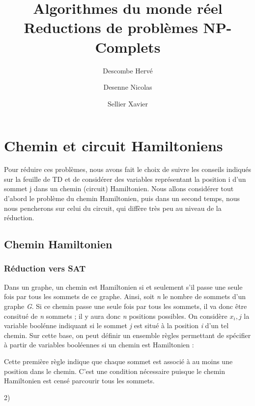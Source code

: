 \documentclass{article}
\title{Algorithmes du monde r\'eel\\Reductions de probl\`emes NP-Complets}
\author{Descombe Herv\'e \and Desenne Nicolas \and Sellier Xavier}
\begin{document}
\maketitle
\newpage
\tableofcontents
\newpage

\section{Chemin et circuit Hamiltoniens}

Pour r\'eduire ces probl\`emes, nous avons fait le choix de suivre les conseils indiqu\'es sur
la feuille de TD et de consid\'erer des variables repr\'esentant la position i d'un sommet j
dans un chemin (circuit) Hamiltonien. Nous allons consid\'erer tout d'abord le probl\`eme du
chemin Hamiltonien, puis dans un second temps, nous nous pencherons sur celui du circuit,
qui diff\`ere tr\`es peu au niveau de la r\'eduction.

\subsection{Chemin Hamiltonien}

\subsubsection{R\'eduction vers SAT}

Dans un graphe, un chemin est Hamiltonien si et seulement s'il passe une seule fois par tous les sommets
de ce graphe. Ainsi, soit \textit{n} le nombre de sommets d'un graphe \textit{G}. Si ce chemin passe une
seule fois par tous les sommets, il va donc \^etre consitu\'e de \textit{n} sommets ; il y aura donc
\textit{n} positions possibles. On consid\`ere $x_i,j$ la variable bool\'enne indiquant si le sommet
\textit{j} est situ\'e \`a la position \textit{i} d'un tel chemin. Sur cette base, on peut d\'efinir un
ensemble r\`egles permettant de sp\'ecifier \`a partir de variables bool\'eennes si un chemin est
Hamiltonien :


Cette premi\`ere r\`egle indique que chaque sommet est associ\'e \`a au moins une position dans le chemin.
C'est une condition n\'ecessaire puisque le chemin Hamiltonien est cens\'e parcourir tous les sommets.

2)%
\end{document}

